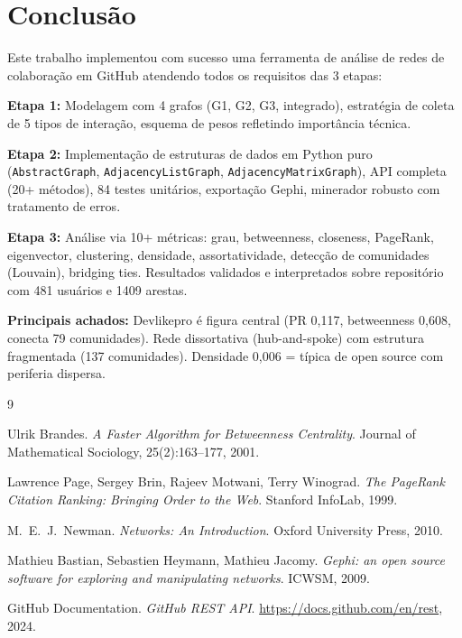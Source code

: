 \documentclass[12pt]{article}
\begin{document}
\section{Conclusão}\label{sec:conclusao}

Este trabalho implementou com sucesso uma ferramenta de análise de redes de colaboração em GitHub atendendo todos os requisitos das 3 etapas:

\textbf{Etapa 1:} Modelagem com 4 grafos (G1, G2, G3, integrado), estratégia de coleta de 5 tipos de interação, esquema de pesos refletindo importância técnica.

\textbf{Etapa 2:} Implementação de estruturas de dados em Python puro (\texttt{AbstractGraph}, \texttt{AdjacencyListGraph}, \texttt{AdjacencyMatrixGraph}), API completa (20+ métodos), 84 testes unitários, exportação Gephi, minerador robusto com tratamento de erros.

\textbf{Etapa 3:} Análise via 10+ métricas: grau, betweenness, closeness, PageRank, eigenvector, clustering, densidade, assortatividade, detecção de comunidades (Louvain), bridging ties. Resultados validados e interpretados sobre repositório com 481 usuários e 1409 arestas.

\textbf{Principais achados:} Devlikepro é figura central (PR 0,117, betweenness 0,608, conecta 79 comunidades). Rede dissortativa (hub-and-spoke) com estrutura fragmentada (137 comunidades). Densidade 0,006 = típica de open source com periferia dispersa.

\begin{thebibliography}{9}

  Ulrik Brandes.
  \textit{A Faster Algorithm for Betweenness Centrality}.
  Journal of Mathematical Sociology, 25(2):163--177, 2001.

  Lawrence Page, Sergey Brin, Rajeev Motwani, Terry Winograd.
  \textit{The PageRank Citation Ranking: Bringing Order to the Web}.
  Stanford InfoLab, 1999.

  M.\ E.\ J.\ Newman.
  \textit{Networks: An Introduction}.
  Oxford University Press, 2010.

  Mathieu Bastian, Sebastien Heymann, Mathieu Jacomy.
  \textit{Gephi: an open source software for exploring and manipulating networks}.
  ICWSM, 2009.

  GitHub Documentation.
  \textit{GitHub REST API}.
  \url{https://docs.github.com/en/rest}, 2024.

\end{thebibliography}
\end{document}
